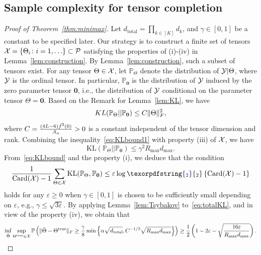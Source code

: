 \documentclass[11pt]{article}
\theoremstyle{plain}
\theoremstyle{definition}
\providecommand{\DIFaddtex}[1]{{\protect\color{blue}\uwave{#1}}} %
\providecommand{\DIFaddbegin}{} %
\providecommand{\DIFaddend}{} %
\providecommand{\DIFadd}[1]{\texorpdfstring{\DIFaddtex{#1}}{#1}} %
\begin{document}
\subsection{Sample complexity for tensor completion}
\begin{proof}[Proof of Theorem~\ref{thm:minimax}]

Let $d_{\text{total}}=\prod_{k\in[K]}d_k$, and $\gamma\in[0,1]$ be a constant to be specified later.  Our strategy is to construct a finite set of tensors $\mathcal{X}=\{\Theta_i\colon i=1,\ldots \}\subset \mathcal{P}$ satisfying the properties of (i)-(iv) in Lemma~\ref{lem:construction}. By Lemma~\ref{lem:construction}, such a subset of tensors exist. For any tensor  $\Theta\in\mathcal{X}$, let $\mathbb{P}_{\Theta}$ denote the distribution of $\mathcal{Y}|\Theta$, where $\mathcal{Y}$ is the ordinal tensor. In particular, $\mathbb{P}_{\mathbf{0}}$ is the distribution of $\mathcal{Y}$ induced by the zero parameter tensor $\mathbf{0}$, i.e., the distribution of $\mathcal{Y}$ conditional on the parameter tensor $\Theta=\mathbf{0}$. Based on the Remark for Lemma~\ref{lem:KL}, we have
\begin{equation}\label{eq:KLbound1}
KL(\mathbb{P}_{\Theta}|| \mathbb{P}_{\mathbf{0}})\leq C \lVert\Theta\rVert_F^2,
\end{equation}
where $C={(4L-6) \dot{f}^2(0)\over  A_\alpha}>0$ is a constant independent of the tensor dimension and rank.
Combining the inequality~\eqref{eq:KLbound1} with property (iii) of $\mathcal{X}$, we have
\begin{equation}\label{eq:KLbound}
\text{KL}(\mathbb{P}_{\Theta}||\mathbb{P}_{\mathbf{0}})\leq \gamma^2 R_{\max} d_{\max}.
\end{equation}
From~\eqref{eq:KLbound} and the property (i), we deduce that the condition
\begin{equation}\label{eq:totalKL}
{1\over \text{Card}(\tX)-1}\sum_{\Theta \in\tX}\text{KL}(\mathbb{P}_{\Theta}, \mathbb{P}_{\mathbf{0}})\leq \varepsilon \log\DIFaddbegin \DIFadd{_2}\DIFaddend \left\{\text{Card}(\tX)-1 \right\}
\end{equation}
holds for any $ \varepsilon \geq 0$ when $\gamma\in[0,1]$ is chosen to be sufficiently small depending on $\varepsilon$, e.g., $\gamma \leq \sqrt{3\varepsilon}$. By applying Lemma~\ref{lem:Tsybakov} to~\eqref{eq:totalKL}, and in view of the property (iv), we obtain that
\begin{equation}\label{eq:final}
\inf_{\hat \Theta}\sup_{\trueT\in \tX}\mathbb{P}\left(\FnormSize{}{\hat \Theta- \trueT}\geq  {\gamma\over 8} \min\left\{ \alpha\sqrt{d_{\text{total}}}, C^{-1/2}\sqrt{ R_{\max}d_{\max}}\right\} \right)\geq {1\over 2}\left(1-2\varepsilon-\sqrt{16 \varepsilon \over R_{\max}d_{\max}}\right).

\end{equation}
\end{proof}
\end{document}
